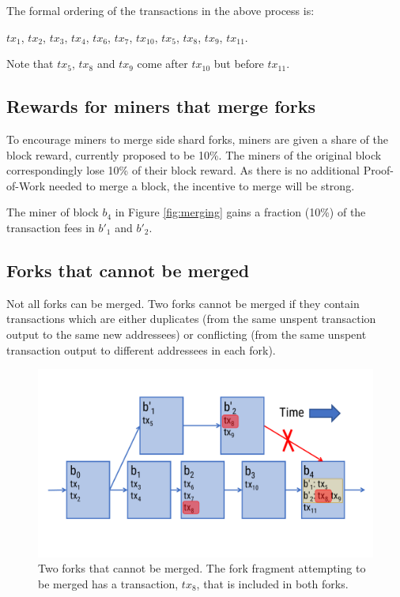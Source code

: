 \documentclass[a4paper,12pt]{article}
\begin{document}
The formal ordering of the transactions in the above process is:

$tx_1$, $tx_2$, $tx_3$, $tx_4$, $tx_6$, $tx_7$, $tx_{10}$, $tx_5$, $tx_8$, $tx_9$, $tx_{11}$.

Note that $tx_5$, $tx_8$ and $tx_9$ come after $tx_{10}$ but before $tx_{11}$.


\subsection{Rewards for miners that merge forks}
To encourage miners to merge side shard forks, miners are given a share of the block reward, currently proposed to be 10\%. The miners of the original block correspondingly lose 10\% of their block reward. As there is no additional Proof-of-Work needed to merge a block, the incentive to merge will be strong. 

The miner of block $b_4$ in Figure \ref{fig:merging} gains a fraction (10\%) of the transaction fees in 
$b'_1$ and $b'_2$. 

\subsection{Forks that cannot be merged}
Not all forks can be merged. Two forks cannot be merged if they contain transactions which are either duplicates (from the same unspent transaction output to the same new addressees) or conflicting (from the same unspent transaction output to different addressees in each fork). 

\begin{figure}[!htb]
  \centering
  \includegraphics[page=1,width=.95\textwidth]{failed-merging} 
  \caption{Two forks that cannot be merged. The fork fragment attempting to be merged has a transaction, $tx_8$, that is included in both forks.}
  \label{fig:failed-merging}
\end{figure}
\FloatBarrier
\end{document}
